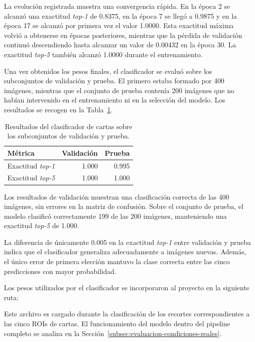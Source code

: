 La evolución registrada muestra una convergencia rápida. En la época 2 se alcanzó una exactitud \textit{top-1} de 0.8375, en la época 7 se llegó a 0.9875 y en la época 17 se alcanzó por primera vez el valor 1.0000. Esta exactitud máxima volvió a obtenerse en épocas posteriores, mientras que la pérdida de validación continuó descendiendo hasta alcanzar un valor de 0.00432 en la época 30. La exactitud \textit{top-5} también alcanzó 1.0000 durante el entrenamiento.

Una vez obtenidos los pesos finales, el clasificador se evaluó sobre los subconjuntos de validación y prueba. El primero estaba formado por 400 imágenes, mientras que el conjunto de prueba contenía 200 imágenes que no habían intervenido en el entrenamiento ni en la selección del modelo. Los resultados se recogen en la Tabla~\ref{tab:metricas-clasificador-cartas}.

\begin{table}[H]
\centering
\small
\begin{tabular}{l r r}
\hline
\textbf{Métrica} & \textbf{Validación} & \textbf{Prueba} \\
\hline
Exactitud \textit{top-1} & 1.000 & 0.995 \\
Exactitud \textit{top-5} & 1.000 & 1.000 \\
\hline
\end{tabular}
\caption{Resultados del clasificador de cartas sobre los subconjuntos de validación y prueba.}
\label{tab:metricas-clasificador-cartas}
\end{table}

Los resultados de validación muestran una clasificación correcta de las 400 imágenes, sin errores en la matriz de confusión. Sobre el conjunto de prueba, el modelo clasificó correctamente 199 de las 200 imágenes, manteniendo una exactitud \textit{top-5} de 1.000.

La diferencia de únicamente 0.005 en la exactitud \textit{top-1} entre validación y prueba indica que el clasificador generaliza adecuadamente a imágenes nuevas. Además, el único error de primera elección mantuvo la clase correcta entre las cinco predicciones con mayor probabilidad.

Los pesos utilizados por el clasificador se incorporaron al proyecto en la siguiente ruta:

\begin{center}
\small
{}
\end{center}

Este archivo es cargado durante la clasificación de los recortes correspondientes a las cinco ROIs de cartas. El funcionamiento del modelo dentro del pipeline completo se analiza en la Sección~\ref{subsec:evaluacion-condiciones-reales}.


